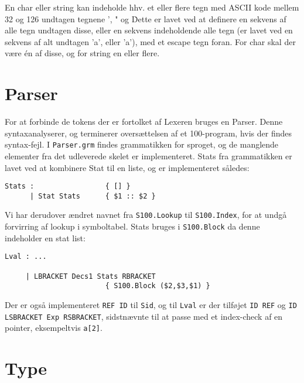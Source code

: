 \documentclass[12pt]{article}
\begin{document}
En char eller string kan indeholde hhv. et eller flere tegn med ASCII kode mellem 32 og 126 undtagen tegnene ’, " og \. Dette er lavet ved at definere en sekvens af alle tegn undtagen disse, eller en sekvens indeholdende alle tegn (er lavet ved en sekvens af alt undtagen 'a', eller 'a'), med et escape tegn foran. For char skal der være én af disse, og for string en eller flere.
    
    
\section{Parser}
For at forbinde de tokens der er fortolket af Lexeren bruges en Parser. Denne syntaxanalyserer, og terminerer oversættelsen af et 100-program, hvis der findes syntax-fejl. I \texttt{Parser.grm} findes grammatikken for sproget, og de manglende elementer fra det udleverede skelet er implementeret. Stats fra grammatikken er lavet ved at kombinere Stat til en liste, og er implementeret således:\\

\begin{verbatim}
Stats :                 { [] }
      | Stat Stats      { $1 :: $2 }
\end{verbatim}

Vi har derudover ændret navnet fra \texttt{S100.Lookup} til \texttt{S100.Index}, for at undgå forvirring af lookup i symboltabel. Stats bruges i \texttt{S100.Block} da denne indeholder en stat list:\\

\begin{verbatim}
Lval : ...

     | LBRACKET Decs1 Stats RBRACKET
                        { S100.Block ($2,$3,$1) }
\end{verbatim}

Der er også implementeret \texttt{REF ID} til \texttt{Sid}, og til \texttt{Lval} er der tilføjet \texttt{ID REF} og \texttt{ID LSBRACKET Exp RSBRACKET}, sidstnævnte til at passe med et index-check af en pointer, eksempeltvis \texttt{a[2]}.

\section{Type}



{}

\end{document}
